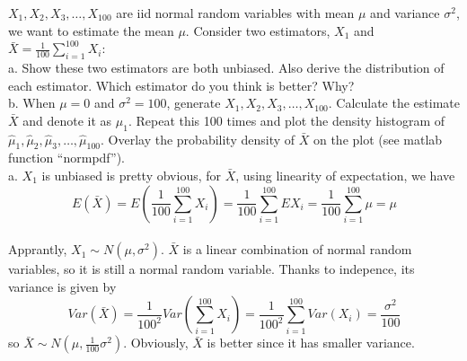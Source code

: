 \documentclass[12pt]{article}
\begin{document}
 {$X_1,X_2,X_3,\ldots,X_{100}$ are iid normal random 
variables with mean $\mu$ and variance $\sigma^2$, we want to estimate 
the mean $\mu$. Consider two estimators, $X_1$ and $\bar{X}=\frac{1}{100}\sum_{i=1}^{100}X_i$: \\
a. Show these two estimators are both unbiased. Also derive the
distribution of each estimator. Which estimator do you think is better? Why?\\
b. When $\mu=0$ and $\sigma^2=100$, generate $X_1,X_2,X_3,\ldots,X_{100}$. Calculate the estimate $\bar{X}$ and denote
it as $\hat{\mu}_1$. Repeat this 100 times and plot the density histogram of $\hat{\mu}_1,
\hat{\mu}_2,\hat{\mu}_3,\ldots,\hat{\mu}_{100}$. Overlay the probability density of $\bar{X}$ on the plot (see matlab function ``normpdf''). \\}
 { \vfill
  \answer
}
 {
 a. $X_1$ is unbiased is pretty obvious, for $\bar{X}$, using linearity of expectation, we have
  \[E(\bar{X})=E(\frac{1}{100}\sum_{i=1}^{100}X_i)=\frac{1}{100}\sum_{i=1}^{100}EX_i=\frac{1}{100}\sum_{i=1}^{100}\mu=\mu \]\\
   Apprantly, $X_1\sim N(\mu,\sigma^2)$. $\bar{X}$ is a linear combination of normal random variables, so it is still a normal random variable. Thanks to indepence, its variance is given by 
   \[Var(\bar{X})=\frac{1}{100^2}Var(\sum_{i=1}^{100}X_i)=\frac{1}{100^2}\sum_{i=1}^{100}Var(X_i)=\frac{\sigma^2}{100}\]
  so $\bar{X}\sim N(\mu, \frac{1}{100}\sigma^2)$. Obviously, $\bar{X}$ is better since it has smaller variance.\\
} 
\end{document}

